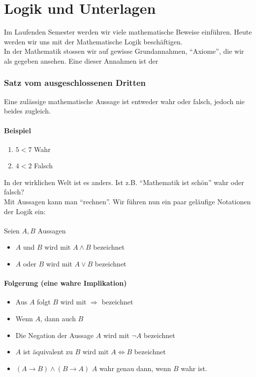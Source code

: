 \chapter{Logik und Unterlagen}
Im Laufenden Semester werden wir viele mathematische Beweise einführen. Heute werden wir uns mit der Mathematische Logik beschäftigen. \\

In der Mathematik stossen wir auf gewisse Grundannahmen, ``Axiome'', die wir als gegeben ansehen. Eine dieser Annahmen ist der 
\subsection*{Satz vom ausgeschlossenen Dritten}
Eine zulässige mathematische Aussage ist entweder wahr oder falsch, jedoch nie beides zugleich.
\subsubsection*{Beispiel}
\begin{enumerate}
	\item $5<7$ Wahr
	\item $4<2$ Falsch
\end{enumerate}
In der wirklichen Welt ist es anders. Ist z.B. ``Mathematik ist schön'' wahr oder falsch?\\

Mit Aussagen kann man ``rechnen''. Wir führen nun ein paar geläufige Notationen der Logik ein:\\
\\
Seien $A,B$ Aussagen
\begin{itemize}
\item $A$ und $B$ wird mit $A\land B$ bezeichnet
\item $A$ oder $B$ wird mit $A\lor B$ bezeichnet
\end{itemize}
\subsubsection*{Folgerung (eine wahre Implikation)}
\begin{itemize}
\item Aus $A$ folgt $B$ wird mit $\Rightarrow$ bezeichnet
\item Wenn $A$, dann auch $B$
\item Die Negation der Aussage $A$ wird mit $\lnot A$ bezeichnet
\item $A$ ist äquivalent zu $B$ wird mit $A\Leftrightarrow B$ bezeichnet
\item $\left(A\to B\right)\land \left( B\to A\right)$ $A$ wahr genau dann, wenn $B$ wahr ist.
\end{itemize}

